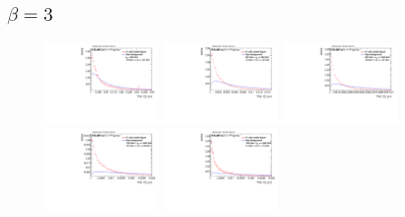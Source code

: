 \subsection*{$\beta=3$}
\begin{figure}
\includegraphics[width=0.3\textwidth]{sascha_input/Appendix/Distributions/higgs/distributions/beta3/h_assisted_tj_C2_3_bin1.pdf} \hspace{1mm}
\includegraphics[width=0.3\textwidth]{sascha_input/Appendix/Distributions/higgs/distributions/beta3/h_assisted_tj_C2_3_bin2.pdf} \hspace{4mm}
\includegraphics[width=0.3\textwidth]{sascha_input/Appendix/Distributions/higgs/distributions/beta3/h_assisted_tj_C2_3_bin3.pdf} 
\bigskip
\includegraphics[width=0.3\textwidth]{sascha_input/Appendix/Distributions/higgs/distributions/beta3/h_assisted_tj_C2_3_bin4.pdf} \hspace{4mm}
\includegraphics[width=0.3\textwidth]{sascha_input/Appendix/Distributions/higgs/distributions/beta3/h_assisted_tj_C2_3_bin5.pdf} 


\end{figure}
